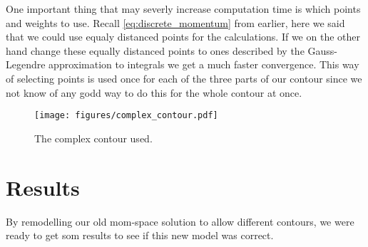One important thing that may severly increase computation time is which points and weights to use.
Recall \cref{eq:discrete_momentum} from earlier, here we said that we could use equaly distanced points for the calculations.
If we on the other hand change these equally distanced points to ones described by the Gauss-Legendre approximation to integrals we get a much faster convergence.
This way of selecting points is used once for each of the three parts of our contour since we not know of any godd way to do this for the whole contour at once.

\begin{figure}
  \centering
    \texttt{[image: figures/complex\_contour.pdf]}
  \caption{The complex contour used.}
  \label{fig:contour}
\end{figure}

\section{Results}
By remodelling our old mom-space solution to allow different contours, we were ready to get som results to see if this new model was correct.
